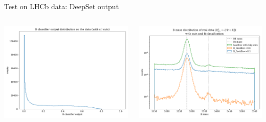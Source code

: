\documentclass[aspectratio=1610, 10pt]{beamer}
\begin{document}
\begin{frame}{Test on LHCb data: DeepSet output}
  \begin{columns}
    \begin{column}{0.5\textwidth}
      \centering
      \includegraphics[width=\textwidth]{images/backup/data_B_classifier_output.pdf}
    \end{column}
    \begin{column}{0.5\textwidth}
      \centering
      \includegraphics[width=\textwidth]{images/backup/data_cut_comparison.pdf}
    \end{column}
  \end{columns}
\end{frame}
\end{document}
